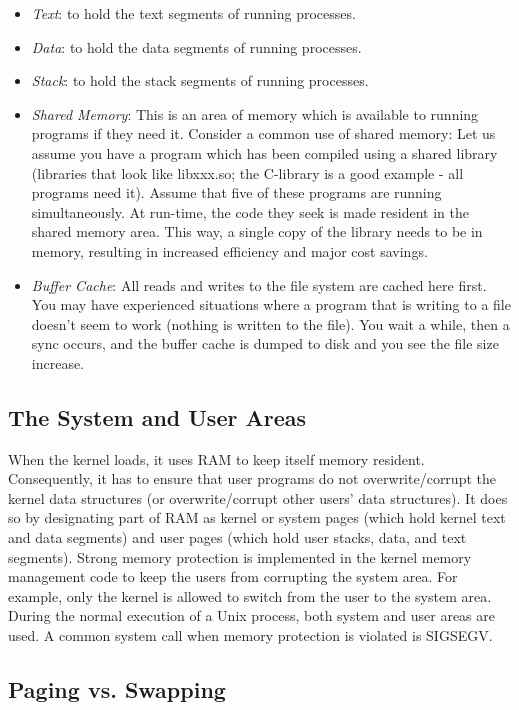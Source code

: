 \documentclass{article}
\begin{document}
\begin{itemize}
    \item \emph{Text}: to hold the text segments of running processes.
    \item \emph{Data}: to hold the data segments of running processes.
    \item \emph{Stack}: to hold the stack segments of running processes.
    \item \emph{Shared Memory}: This is an area of memory which is available to running programs if they need it. Consider a common use of shared memory: Let us assume you have a program which has been compiled using a shared library (libraries that look like libxxx.so; the C-library is a good example - all programs need it). Assume that five of these programs are running simultaneously. At run-time, the code they seek is made resident in the shared memory area. This way, a single copy of the library needs to be in memory, resulting in increased efficiency and major cost savings.
    \item \emph{Buffer Cache}: All reads and writes to the file system are cached here first. You may have experienced situations where a program that is writing to a file doesn't seem to work (nothing is written to the file). You wait a while, then a sync occurs, and the buffer cache is dumped to disk and you see the file size increase.
\end{itemize}
\subsection{The System and User Areas}
When the kernel loads, it uses RAM to keep itself memory resident. Consequently, it
has to ensure that user programs do not overwrite/corrupt the kernel data structures (or
overwrite/corrupt other users' data structures). It does so by designating part of RAM
as kernel or system pages (which hold kernel text and data segments) and user pages
(which hold user stacks, data, and text segments). Strong memory protection is
implemented in the kernel memory management code to keep the users from
corrupting the system area. For example, only the kernel is allowed to switch from the
user to the system area. During the normal execution of a Unix process, both system
and user areas are used. A common system call when memory protection is violated is
SIGSEGV.


\subsection{Paging vs. Swapping}
\end{document}
